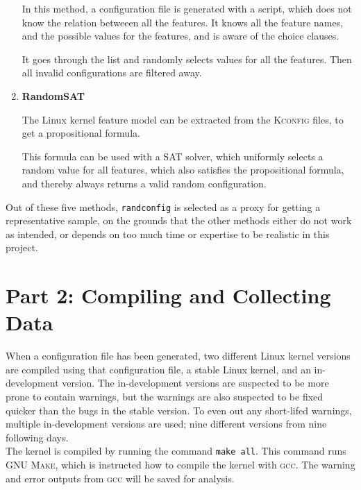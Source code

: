 \documentclass[a4paper,11pt]{report}
\newcommand{\textcode}[1]{\fboxsep=1pt\texttt{\colorbox{gray!20}{#1}}}
\begin{document}
\begin{enumerate}
In this method, a configuration file is generated with a script, which 
does not know the relation betweeen all the features. It knows all the feature
names, and the possible values for the features, and is aware of the choice 
clauses.

It goes through the list and randomly selects values for all the features. Then 
all invalid configurations are filtered away.


    \item \textbf{RandomSAT}

The Linux kernel feature model can be extracted from the \textsc{Kconfig} 
files, to get a propositional formula\cite{lvat}. 

This formula can be used with a SAT solver, which uniformly selects a random
value for all features, which also satisfies the propositional formula, and
thereby always returns a valid random configuration.


    
\end{enumerate}


Out of these five methods, \texttt{randconfig} is selected as a proxy for 
getting a representative sample, on the grounds that the other methods either
do not work as intended, or depends on too much time or expertise to be realistic 
in this project.

            \section{Part 2: Compiling and Collecting Data}

When a configuration file has been generated, two different Linux kernel 
versions are compiled using that configuration file, a stable Linux kernel, and 
an in-development version. The in-development versions are suspected to be more 
prone to contain warnings, but the warnings are also suspected to be fixed 
quicker than the bugs in the stable version. To even out any short-lifed 
warnings, multiple in-development versions are used; nine different versions 
from nine following days.
\\

The kernel is compiled by running the command \textcode{make all}. This command 
runs \textsc{GNU Make}, which is instructed how to compile the kernel with 
\textsc{gcc}. The warning and error outputs from \textsc{gcc} will be saved for analysis.
\\
\end{document}
